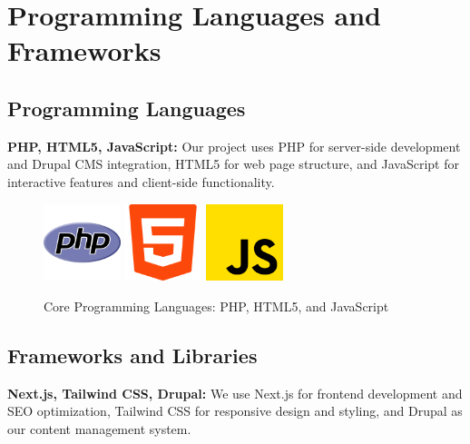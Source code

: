\section{Programming Languages and Frameworks}

\subsection{Programming Languages}
\noindent
\textbf{PHP, HTML5, JavaScript:} Our project uses PHP for server-side development and Drupal CMS integration, HTML5 for web page structure, and JavaScript for interactive features and client-side functionality.

\begin{figure}[H]
    \centering
    \includegraphics[width=0.2\textwidth]{images/php-logo.png}
    \includegraphics[width=0.2\textwidth]{images/html5-logo.png}
    \includegraphics[width=0.2\textwidth]{images/javascript-logo.png}
    \caption{Core Programming Languages: PHP, HTML5, and JavaScript}
\end{figure}

\subsection{Frameworks and Libraries}
\noindent
\textbf{Next.js, Tailwind CSS, Drupal:} We use Next.js for frontend development and SEO optimization, Tailwind CSS for responsive design and styling, and Drupal as our content management system.

